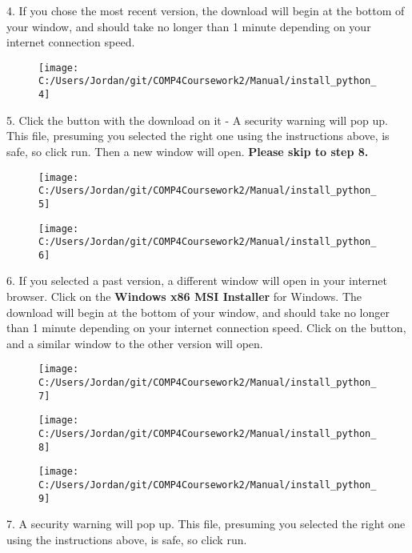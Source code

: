 4. If you chose the most recent version, the download will begin at the bottom of your window, and should take no longer than 1 minute depending on your internet connection speed.

\begin{figure}[H]
    \texttt{[image: C:/Users/Jordan/git/COMP4Coursework2/Manual/install\_python\_4]}
\end{figure}

5. Click the button with the download on it - A security warning will pop up. This file, presuming you selected the right one using the instructions above, is safe, so click run. Then a new window will open. \textbf{Please skip to step 8.}

\begin{figure}[H]
    \texttt{[image: C:/Users/Jordan/git/COMP4Coursework2/Manual/install\_python\_5]}
\end{figure}

\begin{figure}[H]
    \texttt{[image: C:/Users/Jordan/git/COMP4Coursework2/Manual/install\_python\_6]}
\end{figure}

6. If you selected a past version, a different window will open in your internet browser. Click on the \textbf{Windows x86 MSI Installer} for Windows. The download will begin at the bottom of your window, and should take no longer than 1 minute depending on your internet connection speed. Click on the button, and a similar window to the other version will open.

\begin{figure}[H]
    \texttt{[image: C:/Users/Jordan/git/COMP4Coursework2/Manual/install\_python\_7]}
\end{figure}

\begin{figure}[H]
    \texttt{[image: C:/Users/Jordan/git/COMP4Coursework2/Manual/install\_python\_8]}
\end{figure}

\begin{figure}[H]
    \texttt{[image: C:/Users/Jordan/git/COMP4Coursework2/Manual/install\_python\_9]}
\end{figure}

7. A security warning will pop up. This file, presuming you selected the right one using the instructions above, is safe, so click run.

